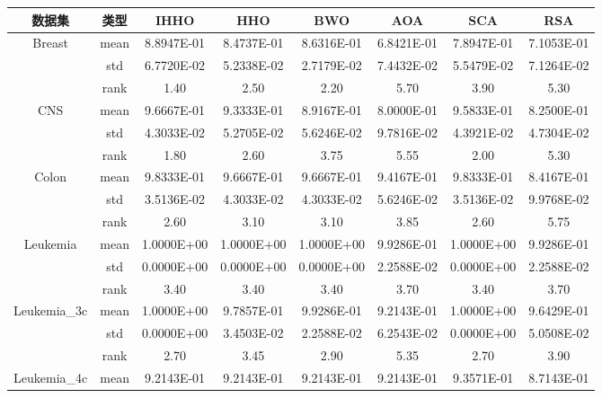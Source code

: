 \documentclass{wzuthesis}
\begin{document}
\begin{table}[htbp]
  \centering
  \footnotesize
    \begin{tabular}{cccccccc}
    \toprule
    数据集   & 类型    & IHHO  & HHO   & BWO   & AOA   & SCA   & RSA \\
    \midrule
    \multirow{3}[1]{*}{Breast} & mean  & 8.8947E-01 & 8.4737E-01 & 8.6316E-01 & 6.8421E-01 & 7.8947E-01 & 7.1053E-01 \\
          & std   & 6.7720E-02 & 5.2338E-02 & 2.7179E-02 & 7.4432E-02 & 5.5479E-02 & 7.1264E-02 \\
          & rank  & 1.40  & 2.50  & 2.20  & 5.70  & 3.90  & 5.30 \\
    \multirow{3}[0]{*}{CNS} & mean  & 9.6667E-01 & 9.3333E-01 & 8.9167E-01 & 8.0000E-01 & 9.5833E-01 & 8.2500E-01 \\
          & std   & 4.3033E-02 & 5.2705E-02 & 5.6246E-02 & 9.7816E-02 & 4.3921E-02 & 4.7304E-02 \\
          & rank  & 1.80  & 2.60  & 3.75  & 5.55  & 2.00  & 5.30 \\
    \multirow{3}[0]{*}{Colon} & mean  & 9.8333E-01 & 9.6667E-01 & 9.6667E-01 & 9.4167E-01 & 9.8333E-01 & 8.4167E-01 \\
          & std   & 3.5136E-02 & 4.3033E-02 & 4.3033E-02 & 5.6246E-02 & 3.5136E-02 & 9.9768E-02 \\
          & rank  & 2.60  & 3.10  & 3.10  & 3.85  & 2.60  & 5.75 \\
    \multirow{3}[0]{*}{Leukemia} & mean  & 1.0000E+00 & 1.0000E+00 & 1.0000E+00 & 9.9286E-01 & 1.0000E+00 & 9.9286E-01 \\
          & std   & 0.0000E+00 & 0.0000E+00 & 0.0000E+00 & 2.2588E-02 & 0.0000E+00 & 2.2588E-02 \\
          & rank  & 3.40  & 3.40  & 3.40  & 3.70  & 3.40  & 3.70 \\
    \multirow{3}[0]{*}{Leukemia\_3c} & mean  & 1.0000E+00 & 9.7857E-01 & 9.9286E-01 & 9.2143E-01 & 1.0000E+00 & 9.6429E-01 \\
          & std   & 0.0000E+00 & 3.4503E-02 & 2.2588E-02 & 6.2543E-02 & 0.0000E+00 & 5.0508E-02 \\
          & rank  & 2.70  & 3.45  & 2.90  & 5.35  & 2.70  & 3.90 \\
    \multirow{3}[0]{*}{Leukemia\_4c} & mean  & 9.2143E-01 & 9.2143E-01 & 9.2143E-01 & 9.2143E-01 & 9.3571E-01 & 8.7143E-01 \\

\end{tabular}
\end{table}
\end{document}
